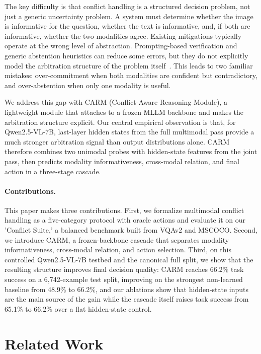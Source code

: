 \documentclass[11pt]{article}
\begin{document}
The key difficulty is that conflict handling is a structured decision problem, not just a
generic uncertainty problem. A system must determine whether the image is informative for
the question, whether the text is informative, and, if both are informative, whether the
two modalities agree. Existing mitigations typically operate at the wrong level of
abstraction. Prompting-based verification and generic abstention heuristics can reduce some
errors, but they do not explicitly model the arbitration structure of the problem
itself~\citep{zhangEvaluatingSteeringModality2025,wenKnowYourLimits2025}. This leads to
two familiar mistakes: over-commitment when both modalities are confident but contradictory,
and over-abstention when only one modality is useful.

We address this gap with CARM (Conflict-Aware Reasoning Module), a lightweight module that attaches to a frozen MLLM
backbone and makes the arbitration structure explicit. Our central empirical observation is
that, for Qwen2.5-VL-7B, last-layer hidden states from the full multimodal pass provide a
much stronger arbitration signal than output distributions alone. CARM therefore combines
two unimodal probes with hidden-state features from the joint pass, then predicts modality
informativeness, cross-modal relation, and final action in a three-stage cascade.

\paragraph{Contributions.}
This paper makes three contributions. First, we formalize multimodal conflict handling as a
five-category protocol with oracle actions and evaluate it on our 'Conflict Suite,' a balanced
benchmark built from VQAv2 and MSCOCO. Second, we introduce CARM, a frozen-backbone cascade that
separates modality informativeness, cross-modal relation, and action selection. Third, on
this controlled Qwen2.5-VL-7B testbed and the canonical full split, we show that the resulting
structure improves final decision quality: CARM reaches 66.2\% task success on a 6,742-example
test split, improving on the strongest non-learned baseline from 48.9\% to 66.2\%, and our
ablations show that hidden-state inputs are the main source of the gain while the cascade
itself raises task success from 65.1\% to 66.2\% over a flat hidden-state control.


\section{Related Work}
\label{sec:related}
\end{document}
